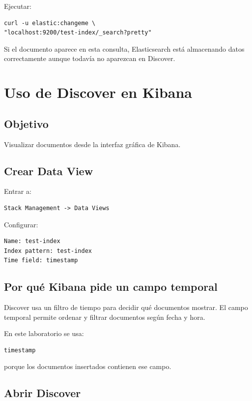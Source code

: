 \documentclass[
  coursetitle={Cómputo Nube y Tecnologías Emergentes},
  coursehours={96},
  coursedate={Verano 2026},
  doctype={Laboratorio},
  otherlangs={english,french},
  authorname={Lázaro},
  authorsurname={Bustio-Martínez},
  authortitle={PhD},
  role={Profesor Investigador},
  email={lbustio@inaoe.mx},
  phone={5559504000},
  ext={7459},
  institution={Instituto Nacional de Astrofísica, Óptica y Electrónica (INAOE)},
  department={Maestría en Ciencias en Tecnologías de Seguridad},
  address={Luis Enrique Erro 1, Sta. Ma. Tonantzintla, San Andrés Cholula, CP 72840, Puebla, México},
  margin={0.5in}
]{../../lbustio_lecture_notes}
\begin{document}
Ejecutar:

\begin{lstlisting}
curl -u elastic:changeme \
"localhost:9200/test-index/_search?pretty"
\end{lstlisting}

Si el documento aparece en esta consulta, Elasticsearch está almacenando datos correctamente aunque todavía no aparezcan en Discover.

\section{Uso de Discover en Kibana}

\subsection{Objetivo}

Visualizar documentos desde la interfaz gráfica de Kibana.

\subsection{Crear Data View}

Entrar a:

\begin{verbatim}
Stack Management -> Data Views
\end{verbatim}

Configurar:

\begin{verbatim}
Name: test-index
Index pattern: test-index
Time field: timestamp
\end{verbatim}

\subsection{Por qué Kibana pide un campo temporal}

Discover usa un filtro de tiempo para decidir qué documentos mostrar. El campo temporal permite ordenar y filtrar documentos según fecha y hora.

En este laboratorio se usa:

\begin{verbatim}
timestamp
\end{verbatim}

porque los documentos insertados contienen ese campo.

\subsection{Abrir Discover}
\end{document}
